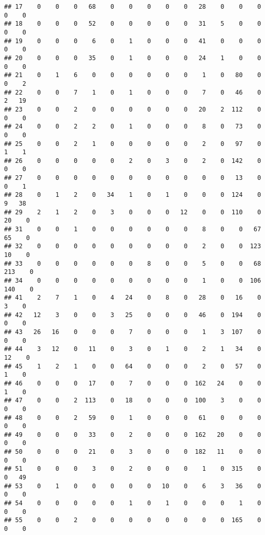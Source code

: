 \documentclass[
]{book}
\begin{document}
\begin{verbatim}
## 17    0    0    0   68    0    0    0    0    0   28    0    0    0    0    0
## 18    0    0    0   52    0    0    0    0    0   31    5    0    0    0    0
## 19    0    0    0    6    0    1    0    0    0   41    0    0    0    0    0
## 20    0    0    0   35    0    1    0    0    0   24    1    0    0    0    0
## 21    0    1    6    0    0    0    0    0    0    1    0   80    0    0    2
## 22    0    0    7    1    0    1    0    0    0    7    0   46    0    2   19
## 23    0    0    2    0    0    0    0    0    0   20    2  112    0    0    0
## 24    0    0    2    2    0    1    0    0    0    8    0   73    0    0    0
## 25    0    0    2    1    0    0    0    0    0    2    0   97    0    1    1
## 26    0    0    0    0    0    2    0    3    0    2    0  142    0    0    0
## 27    0    0    0    0    0    0    0    0    0    0    0   13    0    0    1
## 28    0    1    2    0   34    1    0    1    0    0    0  124    0    9   38
## 29    2    1    2    0    3    0    0    0   12    0    0  110    0   20    0
## 31    0    0    1    0    0    0    0    0    0    8    0    0   67   65    0
## 32    0    0    0    0    0    0    0    0    0    2    0    0  123   10    0
## 33    0    0    0    0    0    0    8    0    0    5    0    0   68  213    0
## 34    0    0    0    0    0    0    0    0    0    1    0    0  106  140    0
## 41    2    7    1    0    4   24    0    8    0   28    0   16    0    3    0
## 42   12    3    0    0    3   25    0    0    0   46    0  194    0    0    0
## 43   26   16    0    0    0    7    0    0    0    1    3  107    0    0    0
## 44    3   12    0   11    0    3    0    1    0    2    1   34    0   12    0
## 45    1    2    1    0    0   64    0    0    0    2    0   57    0    1    0
## 46    0    0    0   17    0    7    0    0    0  162   24    0    0    1    0
## 47    0    0    2  113    0   18    0    0    0  100    3    0    0    0    0
## 48    0    0    2   59    0    1    0    0    0   61    0    0    0    0    0
## 49    0    0    0   33    0    2    0    0    0  162   20    0    0    0    0
## 50    0    0    0   21    0    3    0    0    0  182   11    0    0    0    0
## 51    0    0    0    3    0    2    0    0    0    1    0  315    0    0   49
## 53    0    1    0    0    0    0    0   10    0    6    3   36    0    0    0
## 54    0    0    0    0    0    1    0    1    0    0    0    1    0    0    0
## 55    0    0    2    0    0    0    0    0    0    0    0  165    0    0    0
\end{verbatim}
\end{document}
